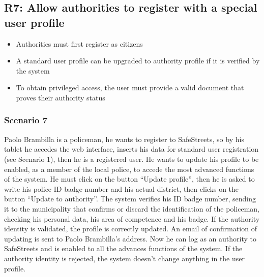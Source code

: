 \subsection{R7: Allow authorities to register with a special user profile}
\begin{itemize}
    \item Authorities must first register as citizens
    \item A standard user profile can be upgraded to authority profile if it is verified by the system
    \item To obtain privileged access, the user must provide a valid document that proves their authority status
\end{itemize}
\subsubsection{Scenario 7}
Paolo Brambilla is a policeman, he wants to register to SafeStreets, so by his tablet he accedes the web interface, inserts his data for standard user registration (see Scenario 1), then he is a registered user. He wants to update his profile to be enabled, as a member of the local police, to accede the most advanced functions of the system. He must click on the button “Update profile”, then he is asked to write his police ID badge number and his actual district, then clicks on the button “Update to authority”. The system verifies his ID badge number, sending it to the municipality that confirms or discard the identification of the policeman, checking his personal data, his area of competence and his badge. If the authority identity is validated, the profile is correctly updated. An email of confirmation of updating is sent to Paolo Brambilla’s address. Now he can log as an authority to SafeStreets and is enabled to all the advances functions of the system. If the authority identity is rejected, the system doesn’t change anything in the user profile.


